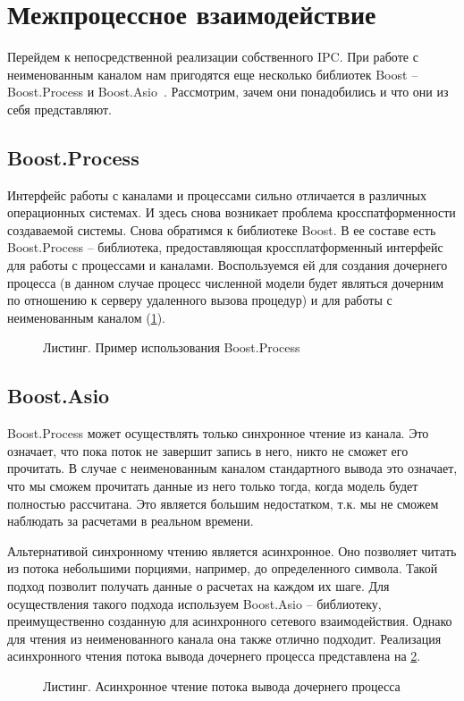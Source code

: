 \documentclass[a4paper,14pt,indentfirst]{extreport}
\begin{document}
\section{Межпроцессное взаимодействие}
Перейдем к непосредственной реализации собственного IPC. При работе с неименованным каналом нам пригодятся еще несколько библиотек Boost -- Boost.Process и Boost.Asio~\cite{3boost}. Рассмотрим, зачем они понадобились и что они из себя представляют.
\subsection{Boost.Process}
Интерфейс работы с каналами и процессами сильно отличается в различных операционных системах. И здесь снова возникает проблема кросспатформенности создаваемой системы. Снова обратимся к библиотеке Boost. В ее составе есть Boost.Process -- библиотека, предоставляющая кроссплатформенный интерфейс для работы с процессами и каналами. Воспользуемся ей для создания дочернего процесса (в данном случае процесс численной модели будет являться дочерним по отношению к серверу удаленного вызова процедур) и для работы с неименованным каналом (\cref{boost_process}).
\begin{figure}[H]
  
  \caption{Листинг. Пример использования Boost.Process~\cite{3boost}}
  \label{boost_process}
\end{figure}
\subsection{Boost.Asio}
Boost.Process может осуществлять только синхронное чтение из канала. Это означает, что пока поток не завершит запись в него, никто не сможет его прочитать. В случае с неименованным каналом стандартного вывода это означает, что мы сможем прочитать данные из него только тогда, когда модель будет полностью рассчитана. Это является большим недостатком, т.к. мы не сможем наблюдать за расчетами в реальном времени.

Альтернативой синхронному чтению является асинхронное. Оно позволяет читать из потока небольшими порциями, например, до определенного символа. Такой подход позволит получать данные о расчетах на каждом их шаге. Для осуществления такого подхода используем Boost.Asio -- библиотеку, преимущественно созданную для асинхронного сетевого взаимодействия. Однако для чтения из неименованного канала она также отлично подходит. Реализация асинхронного чтения потока вывода дочернего процесса представлена на \cref{boost_asio}.
\begin{figure}[h]
  
  \caption{Листинг. Асинхронное чтение потока вывода дочернего процесса~\cite{3boost}}
  \label{boost_asio}
\end{figure}
\end{document}
